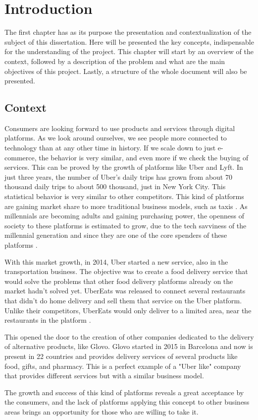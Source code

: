% 
\chapter{Introduction} %
\label{chap:Introduction} 
The first chapter has as its purpose the presentation and contextualization of the subject of this dissertation. Here will be presented the key concepts, indispensable for the understanding of the project. This chapter will start by an overview of the context, followed by a description of the problem and what are the main objectives of this project. Lastly, a structure of the whole document will also be presented.


\section{Context}
\label{sec:introduction_context}
Consumers are looking forward to use products and services through digital platforms. As we look around ourselves, we see people more connected to technology than at any other time in history. If we scale down to just e-commerce, the behavior is very similar, and even more if we check the buying of services. This can be proved by the growth of platforms like Uber and Lyft. In just three years, the number of Uber's daily trips has grown from about 70 thousand daily trips to about 500 thousand, just in New York City. This statistical behavior is very similar to other competitors. This kind of platforms are gaining market share to more traditional business models, such as taxis \parencite{uberStatistics}. As millennials are becoming adults and gaining purchasing power, the openness of society to these platforms is estimated to grow, due to the tech savviness of the millennial generation and since they are one of the core spenders of these platforms \parencite{uberMillenials}.
\par
With this market   growth, in 2014, Uber started a new service, also in the transportation business. The objective was to create a food delivery service that would solve the problems that other food delivery platforms already on the market hadn't solved yet. UberEats was released to connect several restaurants that didn't do home delivery and sell them that service on the Uber platform. Unlike their competitors, UberEats would only deliver to a limited area, near the restaurants in the platform \parencite{whyUberStartedUberEats}. 
\par
This opened the door to the creation of other  companies dedicated to the delivery of alternative products, like Glovo. Glovo started in 2015 in Barcelona and now is present in 22 countries and provides delivery services of several products like food, gifts, and pharmacy. This is a perfect example of a "Uber like" company that provides different services but with a similar business model.
\par
The growth and success of this kind of platforms reveals a great acceptance by the consumers, and the lack of platforms applying this concept to other business areas brings an opportunity for those who are willing to take it.

